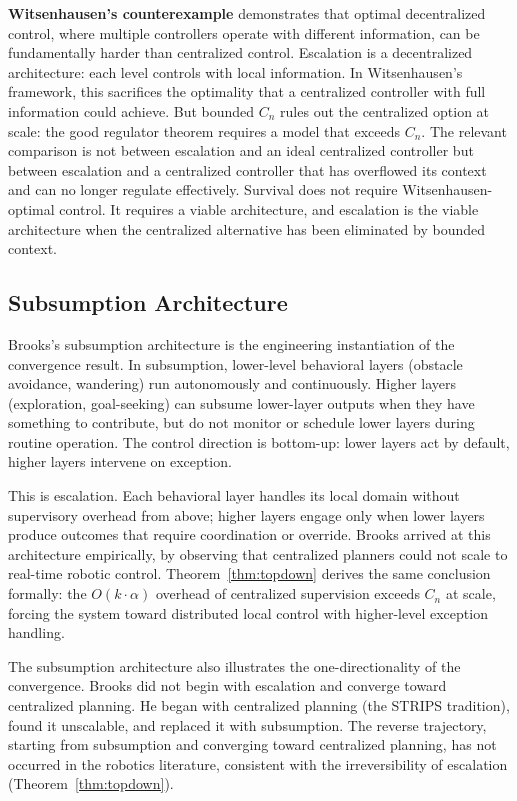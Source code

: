 \documentclass[11pt]{article}
\theoremstyle{definition}
\begin{document}
\textbf{Witsenhausen's counterexample} \cite{Witsenhausen1968}
demonstrates that optimal decentralized control, where multiple
controllers operate with different information, can be fundamentally
harder than centralized control. Escalation is a decentralized
architecture: each level controls with local information. In
Witsenhausen's framework, this sacrifices the optimality that a
centralized controller with full information could achieve. But
bounded $C_n$ rules out the centralized option at scale: the good
regulator theorem requires a model that exceeds $C_n$. The relevant
comparison is not between escalation and an ideal centralized
controller but between escalation and a centralized controller that
has overflowed its context and can no longer regulate effectively.
Survival does not require Witsenhausen-optimal control. It requires
a viable architecture, and escalation is the viable architecture when
the centralized alternative has been eliminated by bounded context.

\subsection{Subsumption Architecture}

Brooks's subsumption architecture \cite{Brooks1986} is the engineering
instantiation of the convergence result. In subsumption, lower-level
behavioral layers (obstacle avoidance, wandering) run autonomously and
continuously. Higher layers (exploration, goal-seeking) can subsume
lower-layer outputs when they have something to contribute, but do not
monitor or schedule lower layers during routine operation. The control
direction is bottom-up: lower layers act by default, higher layers
intervene on exception.

This is escalation. Each behavioral layer handles its local domain
without supervisory overhead from above; higher layers engage only when
lower layers produce outcomes that require coordination or override.
Brooks arrived at this architecture empirically, by observing that
centralized planners could not scale to real-time robotic control.
Theorem~\ref{thm:topdown} derives the same conclusion formally: the
$O(k \cdot \alpha)$ overhead of centralized supervision exceeds $C_n$
at scale, forcing the system toward distributed local control with
higher-level exception handling.

The subsumption architecture also illustrates the one-directionality
of the convergence. Brooks did not begin with escalation and converge
toward centralized planning. He began with centralized planning
(the STRIPS tradition), found it unscalable, and replaced it with
subsumption. The reverse trajectory, starting from subsumption and
converging toward centralized planning, has not occurred in the
robotics literature, consistent with the irreversibility of escalation
(Theorem~\ref{thm:topdown}).
\end{document}
